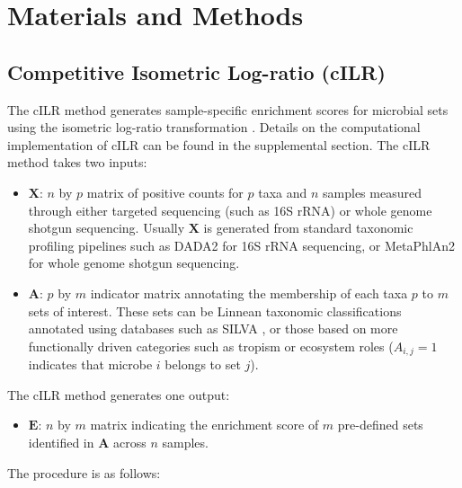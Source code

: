 \documentclass{article}
\begin{document}
\section*{Materials and Methods} \label{Methods}
\subsection*{Competitive Isometric Log-ratio (cILR)}
The cILR method generates sample-specific enrichment scores for microbial sets using the isometric log-ratio transformation \cite{egozcue2003}. Details on the computational implementation of cILR can be found in the supplemental section. The cILR method takes two inputs:  
\begin{itemize}
    \item $\mathbf{X}$: $n$ by $p$ matrix of positive counts for $p$ taxa and $n$ samples measured through either targeted sequencing (such as 16S rRNA) or whole genome shotgun sequencing. Usually $\mathbf{X}$ is generated from standard taxonomic profiling pipelines such as DADA2 \cite{callahan2016} for 16S rRNA sequencing, or MetaPhlAn2 \cite{truong2015} for whole genome shotgun sequencing. 
    \item $\mathbf{A}$: $p$ by $m$ indicator matrix annotating the membership of each taxa $p$ to $m$ sets of interest. These sets can be Linnean taxonomic classifications annotated using databases such as SILVA \cite{quast2013}, or those based on more functionally driven categories such as tropism or ecosystem roles ($A_{i,j} = 1$ indicates that microbe $i$ belongs to set $j$). 
\end{itemize}
The cILR method generates one output:  
\begin{itemize} 
    \item $\mathbf{E}$: $n$ by $m$ matrix indicating the enrichment score of $m$ pre-defined sets identified in $\mathbf{A}$ across $n$ samples. 
\end{itemize}
The procedure is as follows:  
\end{document}
